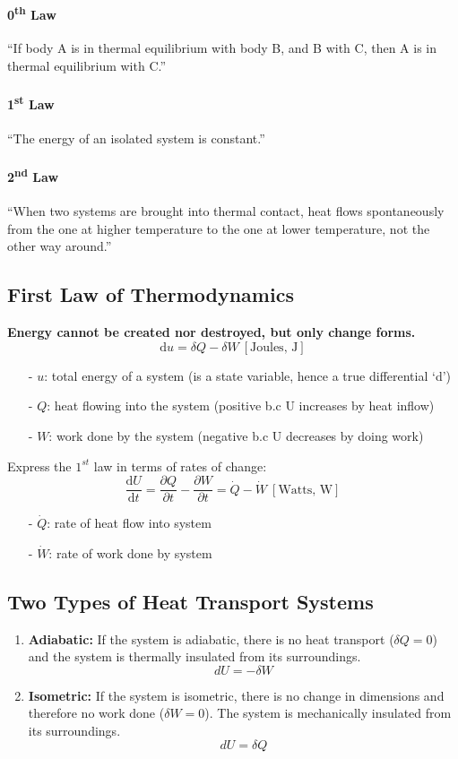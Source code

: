 \documentclass[12pt, a4paper]{article}
\begin{document}
\paragraph{0\textsuperscript{th} Law} ``If body A is in thermal equilibrium with body B, and B with C, then A is in thermal equilibrium with C.''

\paragraph{1\textsuperscript{st} Law} ``The energy of an isolated system is constant.''

\paragraph{2\textsuperscript{nd} Law} ``When two systems are brought into thermal contact, heat flows spontaneously from the one at higher temperature to the one at lower temperature, not the other way around.''

\subsection{First Law of Thermodynamics}
\textbf{Energy cannot be created nor destroyed, but only change forms.}
\[ 
    \mathrm{d}u = \delta Q - \delta W \  [\text{Joules, \ J}]  
\] 
\begin{itemize}
    \item[-] $u$: total energy of a system (is a state variable, hence a true differential `d’)
    \item[-] $Q$: heat flowing into the system (positive b.c U increases by heat inflow) 
    \item[-] $W$: work done by the system (negative b.c U decreases by doing work)
\end{itemize}
 
Express the $1^{st}$ law in terms of rates of change:
\[ 
    \frac{\mathrm{d}U}{\mathrm{d}t} = \frac{\partial Q}{\partial t} - \frac{\partial W}{\partial t} = \dot{Q}-\dot{W} \ [\text{Watts, \ W}]  
\]
\begin{itemize}
    \item[-] \textbf{$\dot{Q}$}: rate of heat flow into system 
    \item[-] \textbf{$\dot{W}$}: rate of work done by system
\end{itemize}
 
\subsection{Two Types of Heat Transport Systems}
\begin{enumerate}
    \item \textbf{Adiabatic:} If the system is adiabatic, there is no heat transport ($\delta Q = 0$) and the system is thermally insulated from its surroundings.
    \[ dU = -\delta W \]
    \item \textbf{Isometric:} If the system is isometric, there is no change in dimensions and therefore no work done ($\delta W = 0$). The system is mechanically insulated from its surroundings. 
    \[ dU = \delta Q \]
\end{enumerate}
\end{document}

